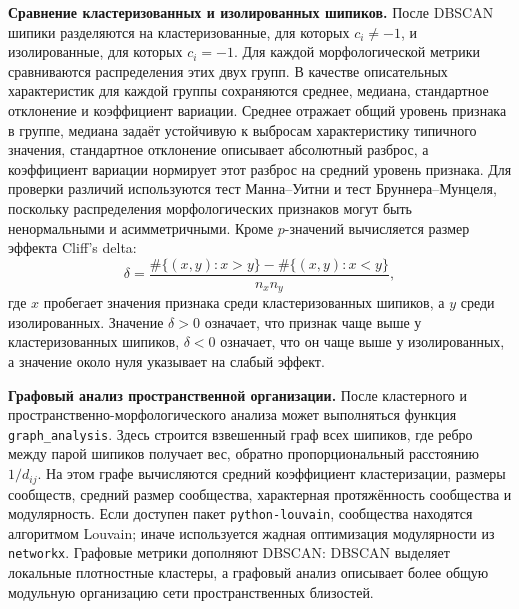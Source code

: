 \documentclass[12pt,a4paper]{article}
\begin{document}
\noindent\textbf{Сравнение кластеризованных и изолированных шипиков.}
После DBSCAN шипики разделяются на кластеризованные, для которых \(c_i\neq -1\), и изолированные, для которых \(c_i=-1\). Для каждой морфологической метрики сравниваются распределения этих двух групп. В качестве описательных характеристик для каждой группы сохраняются среднее, медиана, стандартное отклонение и коэффициент вариации. Среднее отражает общий уровень признака в группе, медиана задаёт устойчивую к выбросам характеристику типичного значения, стандартное отклонение описывает абсолютный разброс, а коэффициент вариации нормирует этот разброс на средний уровень признака. Для проверки различий используются тест Манна--Уитни и тест Бруннера--Мунцеля, поскольку распределения морфологических признаков могут быть ненормальными и асимметричными. Кроме \(p\)-значений вычисляется размер эффекта Cliff's delta:
\[
\delta=\frac{\#\{(x,y):x>y\}-\#\{(x,y):x<y\}}{n_xn_y},
\]
где \(x\) пробегает значения признака среди кластеризованных шипиков, а \(y\) среди изолированных. Значение \(\delta>0\) означает, что признак чаще выше у кластеризованных шипиков, \(\delta<0\) означает, что он чаще выше у изолированных, а значение около нуля указывает на слабый эффект.

\noindent\textbf{Графовый анализ пространственной организации.}
После кластерного и пространственно-морфологического анализа может выполняться функция \texttt{graph\_analysis}. Здесь строится взвешенный граф всех шипиков, где ребро между парой шипиков получает вес, обратно пропорциональный расстоянию \(1/d_{ij}\). На этом графе вычисляются средний коэффициент кластеризации, размеры сообществ, средний размер сообщества, характерная протяжённость сообщества и модулярность. Если доступен пакет \texttt{python-louvain}, сообщества находятся алгоритмом Louvain; иначе используется жадная оптимизация модулярности из \texttt{networkx}. Графовые метрики дополняют DBSCAN: DBSCAN выделяет локальные плотностные кластеры, а графовый анализ описывает более общую модульную организацию сети пространственных близостей.
\end{document}
